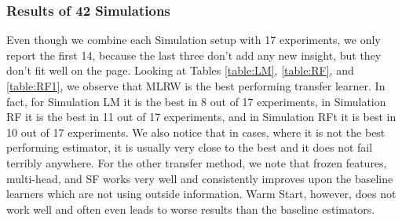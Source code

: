 \subsubsection*{Results of 42 Simulations}
Even though we combine each Simulation setup with 17 experiments, we only report the first 14, because the last three don't add any new insight, but they don't fit well on the page. 
Looking at Tables \ref{table:LM}, \ref{table:RF}, and \ref{table:RF1}, we observe that MLRW is the best performing transfer learner. In fact, for Simulation LM it is the best in 8 out of 17 experiments, in Simulation RF it is the best in 11 out of 17 experiments, and in Simulation RFt it is best in 10 out of 17 experiments. We also notice that in cases, where it is not the best performing estimator, it is usually very close to the best and it does not fail terribly anywhere. 
For the other transfer method, we note that frozen features, multi-head, and SF works very well and consistently improves upon the baseline learners which are not using outside information. Warm Start, however, does not work well and often even leads to worse results than the baseline estimators.  



